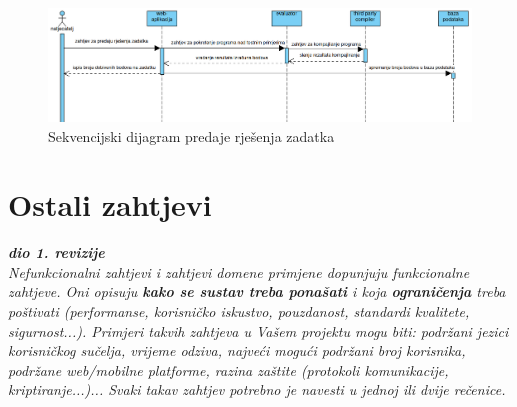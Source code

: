 				\begin{figure}[htbp]
					\centering
					\includegraphics[width=\linewidth]{slike/predaja_rjesenja_zadatka.png}
					\caption{Sekvencijski dijagram predaje rješenja zadatka}\label{fig:seqdiag_rjesenja}
				\end{figure}


			\eject 
	
		\section{Ostali zahtjevi}
		
			\textbf{\textit{dio 1. revizije}}\\
		 
			 \textit{Nefunkcionalni zahtjevi i zahtjevi domene primjene dopunjuju funkcionalne zahtjeve. Oni opisuju \textbf{kako se sustav treba ponašati} i koja \textbf{ograničenja} treba poštivati (performanse, korisničko iskustvo, pouzdanost, standardi kvalitete, sigurnost...). Primjeri takvih zahtjeva u Vašem projektu mogu biti: podržani jezici korisničkog sučelja, vrijeme odziva, najveći mogući podržani broj korisnika, podržane web/mobilne platforme, razina zaštite (protokoli komunikacije, kriptiranje...)... Svaki takav zahtjev potrebno je navesti u jednoj ili dvije rečenice.}
			 
			 
			 
	